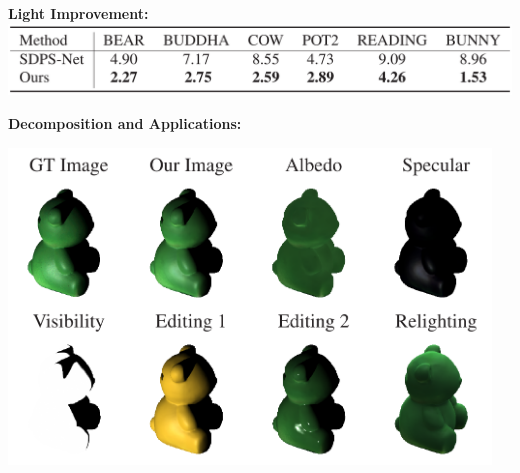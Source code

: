 \documentclass[landscape,a0paper,fontscale=0.292]{baposter}
\begin{document}
\begin{poster}
{\begin{minipage}[t]{0.49\textwidth}
\begin{minipage}[t]{0.53\textwidth}
        \textbf{\color{ctitle}Light Improvement:} \\
            \includegraphics[width=\textwidth]{images/table_improve_light.pdf}
        \end{minipage}\hfill
        \begin{minipage}[t]{0.465\textwidth}
            \textbf{\color{ctitle}Decomposition and Applications:}
            \vspace{-2em}
            \begin{center} 
                \includegraphics[width=0.96\textwidth]{images/fig_application.pdf}
            \end{center}
        \end{minipage}
        

\end{minipage}}
\end{poster}
\end{document}
